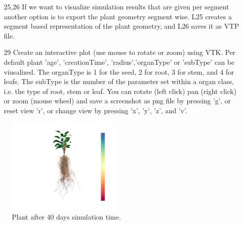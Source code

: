 \begin{itemize}
 \item[25,26] If we want to visualize simulation results that are given per segment another option is to export the plant geometry segment wise. L25 creates a segment based representation of the plant geometry, and L26 saves it as VTP file.
 \item[29] Create an interactive plot (use mouse to rotate or zoom) using VTK. Per default plant 'age', 'creationTime', 'radius','organType' or 'subType' can be viusalized. The organType is 1 for the seed, 2 for root, 3 for stem, and 4 for leafs. The subType is the number of the parameter set within a organ class, i.e. the type of root, stem or leaf. You can rotate (left click) pan (right click) or zoom (mouse wheel) and save a screenshot as png file by pressing 'g', or reset view 'r', or change view by pressing 'x', 'y', 'z', and 'v'.
 \end{itemize}
  
\begin{figure}
\centering
\includegraphics[width=0.5\textwidth]{figures/intro_basic.png} 
\caption{Plant after 40 days simulation time.} \label{fig:intro_basic}
\end{figure}  

